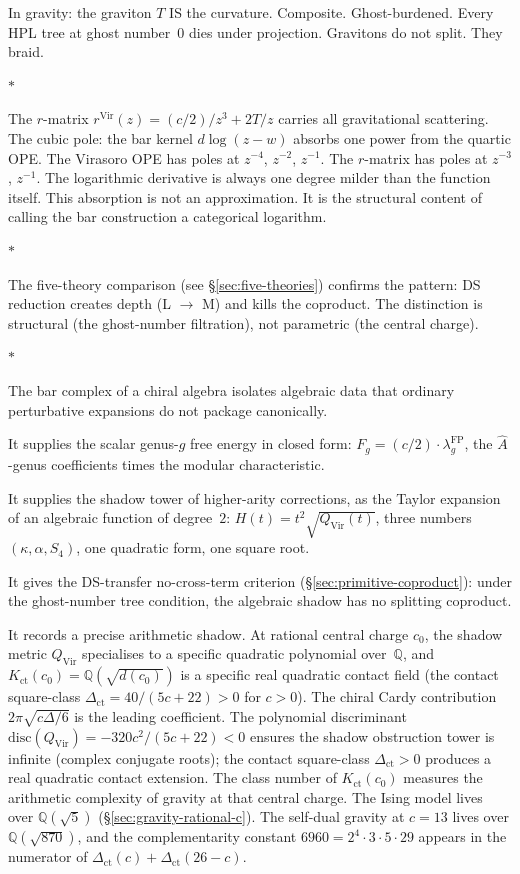 \documentclass[11pt]{article}
\newcommand{\Q}{\mathbb{Q}}
\newcommand{\sep}{\bigskip\begin{center}$*$\end{center}\medskip}
\begin{document}
In gravity: the graviton $T$ IS the curvature.  Composite.
Ghost-burdened.  Every HPL tree at ghost number~$0$ dies under
projection.  Gravitons do not split.  They braid.

\sep

The $r$-matrix $r^{\mathrm{Vir}}(z) = (c/2)/z^3 + 2T/z$
carries all gravitational scattering.  The cubic pole: the bar
kernel $d\log(z-w)$ absorbs one power from the quartic OPE.
The Virasoro OPE has poles at $z^{-4}$, $z^{-2}$, $z^{-1}$.
The $r$-matrix has poles at $z^{-3}$, $z^{-1}$.  The
logarithmic derivative is always one degree milder than the
function itself.  This absorption is not an approximation.  It
is the structural content of calling the bar construction a
categorical logarithm.

\sep

The five-theory comparison (see \S\ref{sec:five-theories})
confirms the pattern: DS reduction creates depth (L $\to$ M)
and kills the coproduct.  The distinction is structural
(the ghost-number filtration), not parametric (the central charge).

\sep

The bar complex of a chiral algebra isolates algebraic data that
ordinary perturbative expansions do not package canonically.

It supplies the scalar genus-$g$ free energy in
closed form:
$F_g = (c/2) \cdot \lambda_g^{\mathrm{FP}}$, the
$\hat{A}$-genus coefficients times the modular characteristic.

It supplies the shadow tower of higher-arity corrections,
as the Taylor expansion of an algebraic function of degree~$2$:
$H(t) = t^2\sqrt{Q_{\mathrm{Vir}}(t)}$, three numbers
$(\kappa, \alpha, S_4)$, one quadratic form, one square root.

It gives the DS-transfer no-cross-term criterion
(\S\ref{sec:primitive-coproduct}): under the ghost-number tree
condition, the algebraic shadow has no splitting coproduct.

It records a precise arithmetic shadow.  At rational central charge $c_0$,
the shadow metric $Q_{\mathrm{Vir}}$ specialises to a specific
quadratic polynomial over~$\Q$, and
$K_{\mathrm{ct}}(c_0) = \Q(\sqrt{d(c_0)})$ is a specific real
quadratic contact field (the contact square-class
$\Delta_{\mathrm{ct}} = 40/(5c{+}22) > 0$ for $c > 0$).  The
chiral Cardy contribution $2\pi\sqrt{c\Delta/6}$
is the leading coefficient.  The polynomial discriminant
$\mathrm{disc}(Q_{\mathrm{Vir}}) = -320c^2/(5c+22) < 0$ ensures
the shadow obstruction tower is infinite (complex conjugate roots); the
contact square-class $\Delta_{\mathrm{ct}}>0$ produces a real
quadratic contact extension.  The class number of $K_{\mathrm{ct}}(c_0)$ measures the arithmetic complexity
of gravity at that central charge.  The Ising model lives over
$\Q(\sqrt{5})$ (\S\ref{sec:gravity-rational-c}).
The self-dual gravity at $c = 13$ lives over $\Q(\sqrt{870})$,
and the complementarity constant $6960 = 2^4 \cdot 3 \cdot 5
\cdot 29$ appears in the numerator of
$\Delta_{\mathrm{ct}}(c) + \Delta_{\mathrm{ct}}(26{-}c)$.
\end{document}

